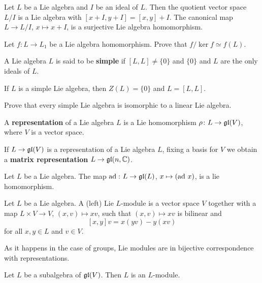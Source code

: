 Let $L$ be a Lie algebra and $I$ be an ideal of $L$. Then 
the quotient vector space $L/I$ is a Lie algebra
with $[x+I,y+I]=[x,y]+I$. The canonical map 
$L\to L/I$, $x\mapsto x+I$, 
is a surjective Lie algebra homomorphism. 

\begin{exercise}
    Let $f\colon L\to L_1$ be a Lie algebra homomorphism.
    Prove that $f/\ker f\simeq f(L)$. 
\end{exercise}

\begin{definition}
    A Lie algebra $L$ is said to be \textbf{simple} if 
    $[L,L]\ne\{0\}$ and $\{0\}$ and $L$ are the only ideals of $L$. 
\end{definition}

If $L$ is a simple Lie algebra, then $Z(L)=\{0\}$ and $L=[L,L]$. 

\begin{exercise}
    Prove that every simple Lie algebra is isomorphic to 
    a linear Lie algebra. 
\end{exercise}


\begin{definition}
    A \textbf{representation} of a Lie algebra $L$ 
    is a Lie homomorphism $\rho\colon L\to\mathfrak{gl}(V)$, where $V$ is a vector space. 
\end{definition}

If $L\to\mathfrak{gl}(V)$ is a representation of a Lie algebra $L$, 
fixing a basis for $V$ 
we obtain a \textbf{matrix representation}
$L\to\mathfrak{gl}(n,\mathbb{C})$. 

\begin{example}
    Let $L$ be a Lie algebra. 
    The map $\operatorname{ad}\,\colon L\to\mathfrak{gl}(L)$, $x\mapsto (\operatorname{ad}\,x)$, is a lie 
    homomorphism. 
\end{example}

\begin{definition}
Let $L$ be a Lie algebra. 
A (left) Lie $L$-module is a vector space $V$ 
together with a map $L\times V\to V$, $(x,v)\mapsto xv$, 
such that $(x,v)\mapsto xv$ is bilinear 
and 
\[
    [x,y]v=x(yv)-y(xv)
\]
for all $x,y\in L$ and $v\in V$. 
\end{definition}

As it happens in the case of groups, Lie modules are
in bijective correspondence with representations. 

\begin{example}
    Let $L$ be a subalgebra of $\mathfrak{gl}(V)$. Then 
    $L$ is an $L$-module. 
\end{example}


